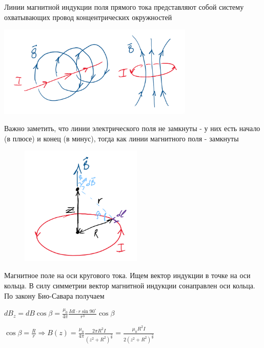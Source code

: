 Линии магнитной индукции поля прямого тока представляют собой систему охватывающих провод концентрических окружностей

\begin{center}
    \includegraphics[width=0.7\textwidth]{physics2/images/physics2_2025_02_10_1}
\end{center}

Важно заметить, что линии электрического поля не замкнуты - у них есть начало (в плюсе) и конец (в минус), тогда 
как линии магнитного поля - замкнуты

\begin{minipage}{\textwidth}
    \begin{figure}
        \includegraphics[width=5.8cm]{physics2/images/physics2_2025_02_10_3}
    \end{figure}

    \Ex Магнитное поле на оси кругового тока. Ищем вектор индукции в точке на оси кольца. 
    В силу симметрии вектор магнитной индукции сонаправлен оси кольца. По закону Био-Савара получаем

    $dB_z = dB \cos \beta = \frac{\mu_0}{4\pi} \frac{Idl \cdot r\sin 90^\circ}{r^3} \cos \beta$

    $\cos \beta = \frac{R}{r} \Longrightarrow B(z) = \frac{\mu_0}{4\pi} \frac{2\pi R^2 I}{(z^2 + R^2)^\frac{3}{2}} = \frac{\mu_0 R^2 I}{2 (z^2 + R^2)^\frac{3}{2}}$
\end{minipage}



